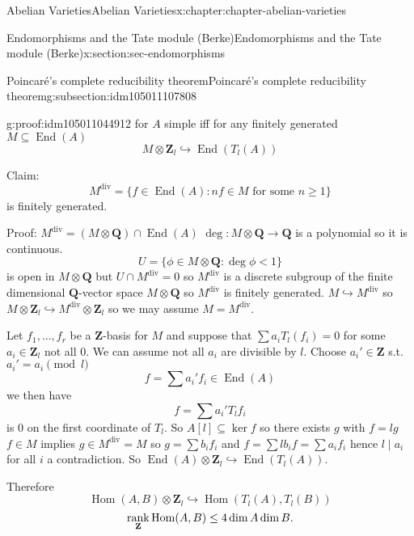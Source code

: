 \documentclass[oneside,10pt,]{book}
\newcommand{\qedhere}{\relax}
\numberwithin{equation}{section}
\newcommand{\lb}{[}
\newcommand{\rb}{]}
\newcommand{\ZZ}{\mathbf{Z}}
\newcommand{\QQ}{\mathbf{Q}}
\DeclareMathOperator{\End}{End}
\DeclareMathOperator{\Hom}{Hom}
\DeclareMathOperator{\rank}{rank}
\newcommand{\lt}{<}
\begin{document}
\begin{chapterptx}{Abelian Varieties}{}{Abelian Varieties}{}{}{x:chapter:chapter-abelian-varieties}
\begin{sectionptx}{Endomorphisms and the Tate module (Berke)}{}{Endomorphisms and the Tate module (Berke)}{}{}{x:section:sec-endomorphisms}
\begin{subsectionptx}{Poincaré's complete reducibility theorem}{}{Poincaré's complete reducibility theorem}{}{}{g:subsection:idm105011107808}
\begin{proofptx}{}{g:proof:idm105011044912}
for \(A\) simple iff for any finitely generated \(M \subseteq \End(A)\)%
\begin{equation*}
M \otimes \ZZ_l \hookrightarrow \End(T_l(A))
\end{equation*}
%
\par
Claim:%
\begin{equation*}
M^{\text{div}} = \{f\in \End(A) : nf\in M \text{ for some }n\ge 1\}
\end{equation*}
is finitely generated.%
\par
Proof: \(M^\text{div} = (M\otimes \QQ) \cap \End(A)\) \(\deg \colon M \otimes \QQ \to \QQ\) is a polynomial so it is continuous.%
\begin{equation*}
U = \{\phi\in M \otimes \QQ : \deg \phi \lt 1\}
\end{equation*}
is open in \(M \otimes \QQ\) but \(U \cap M^\text{div} = 0\) so \(M^\text{div} \) is a discrete subgroup of the finite dimensional \(\QQ\)-vector space \(M \otimes \QQ\) so \(M^\text{div}\) is finitely generated. \(M \hookrightarrow M^\text{div}\) so \(M \otimes \ZZ_l \hookrightarrow M^\text{div} \otimes \ZZ_l\) so  we may assume \(M = M^\text{div}\).%
\par
Let \(f_1,\ldots, f_r\) be a \(\ZZ\)-basis for \(M\) and suppose that \(\sum a_iT_l(f_i)=0\) for some \(a_i \in \ZZ_l\) not all 0. We can assume not all \(a_i\) are divisible by \(l\). Choose \(a_i' \in \ZZ\) s.t. \(a_i'=a_i \pmod{l}\)%
\begin{equation*}
f = \sum a_i' f_i \in \End(A)
\end{equation*}
we then have%
\begin{equation*}
f = \sum a_i' T_lf_i
\end{equation*}
is 0 on the first coordinate of \(T_l\). So \(A\lb l \rb \subseteq \ker f\) so there exists \(g\) with \(f= lg\) \(f\in M\) implies \(g\in M^\text{div} = M\) so \(g = \sum b_i f_i\) and \(f = \sum lb_i f = \sum a_i f_i\) hence \(l\mid a_i\) for all \(i\) a contradiction. So \(\End(A)\otimes \ZZ_l \hookrightarrow \End(T_l(A))\).%
\par
Therefore%
\begin{equation*}
\Hom(A,B) \otimes \ZZ_l \hookrightarrow \Hom(T_l(A), T_l(B))
\end{equation*}
%
\begin{equation*}
\rank_\ZZ \Hom(A,B) \le 4 \dim A\dim B\text{.}\qedhere
\end{equation*}
%
\end{proofptx}
\end{subsectionptx}

\end{sectionptx}
\end{chapterptx}
\end{document}
